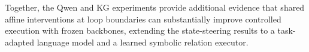 \documentclass{article}
\begin{document}
\FloatBarrier
Together, the Qwen and KG experiments provide additional evidence that shared affine interventions at loop boundaries can substantially improve controlled execution with frozen backbones, extending the state-steering results to a task-adapted language model and a learned symbolic relation executor.
\end{document}
